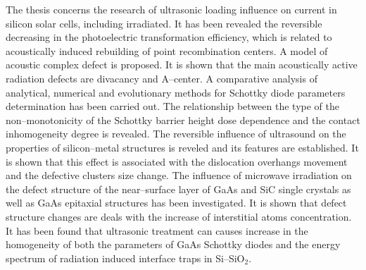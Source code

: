 The thesis concerns the research of ultrasonic loading influence on current in silicon solar cells,
 including irradiated.
 It has been revealed the reversible decreasing in the photoelectric transformation efficiency,
 which is related to acoustically induced rebuilding of point recombination centers.
 A model of acoustic complex defect is proposed.
 It is shown that the main acoustically active radiation defects are divacancy and A--center.
 A comparative analysis of analytical, numerical and evolutionary methods for Schottky diode parameters determination  has been carried out.
 The relationship between the type of the non--monotonicity of the Schottky barrier height dose dependence and the contact inhomogeneity degree is revealed.
 The reversible influence of ultrasound on the properties of silicon--metal structures is reveled and its features are established.
It is shown that this effect is associated with the dislocation overhangs movement and the defective clusters size change.
 The influence of microwave irradiation on the defect structure of the near--surface layer of  GaAs and SiC single crystals as well as GaAs epitaxial structures has been investigated.
 It is shown that defect structure changes are deals with the increase of interstitial atoms concentration.
 It has been found that ultrasonic treatment can causes increase in the homogeneity of both the parameters of GaAs Schottky diodes and the energy spectrum of radiation induced interface traps in Si--SiO$_2$.

\keywordsEn
